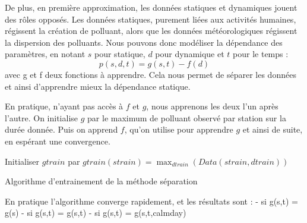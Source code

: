 De plus, en première approximation, les données statiques et dynamiques jouent des rôles opposés. Les données statiques, purement liées aux activités humaines, régissent la création de polluant, alors que les données météorologiques régissent la dispersion des polluants. Nous pouvons donc modéliser la dépendance des paramètres, en notant $s$ pour statique, $d$ pour dynamique et $t$ pour le temps : $$ p(s,d,t) = g(s,t) - f(d)$$ avec g et f deux fonctions à apprendre. Cela nous permet de séparer les données et ainsi d'apprendre mieux la dépendance statique.

En pratique, n'ayant pas accès à $f$ et $g$, nous apprenons les deux l'un après l'autre. On initialise $g$ par le maximum de polluant observé par station sur la durée donnée. Puis on apprend $f$, qu'on utilise pour apprendre $g$ et ainsi de suite, en espérant une convergence. 

\begin{algorithm}[]
	Initialiser $gtrain$ par $gtrain(strain) = \max_{dtrain}(Data(strain,dtrain))$ \;
	\caption{Algorithme d'entrainement de la méthode séparation}
\end{algorithm}

En pratique l'algorithme converge rapidement, et les résultats sont :
 - si g(s,t) = g(s)
 - si g(s,t) = g(s,t)
 - si g(s,t) = g(s,t,calmday)

